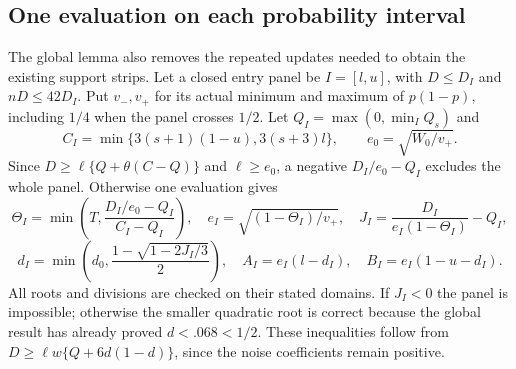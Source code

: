 \subsection{One evaluation on each probability interval}
The global lemma also removes the repeated updates needed to obtain the
existing support strips. Let a closed entry panel be $I=[l,u]$, with
$D\le D_I$ and $nD\le42D_I$. Put $v_-,v_+$ for its actual minimum and
maximum of $p(1-p)$, including $1/4$ when the panel crosses $1/2$.
Let $Q_I=\max(0,\min_I Q_s)$ and
\[
 C_I=\min\{3(s+1)(1-u),3(s+3)l\},\qquad e_0=\sqrt{W_0/v_+}.
\]
Since $D\ge\ell\{Q+\theta(C-Q)\}$ and $\ell\ge e_0$, a negative
$D_I/e_0-Q_I$ excludes the whole panel. Otherwise one evaluation gives
\begin{equation}\label{v10:geometry:panel}
 \Theta_I=\min\left(T,\frac{D_I/e_0-Q_I}{C_I-Q_I}\right),\quad
 e_I=\sqrt{(1-\Theta_I)/v_+},\quad
 J_I=\frac{D_I}{e_I(1-\Theta_I)}-Q_I,
\end{equation}
\[
 d_I=\min\left(d_0,\frac{1-\sqrt{1-2J_I/3}}2\right),\quad
 A_I=e_I(l-d_I),\quad B_I=e_I(1-u-d_I).
\]
All roots and divisions are checked on their stated domains. If $J_I<0$
the panel is impossible; otherwise the smaller quadratic root is correct
because the global result has already proved $d<.068<1/2$.
These inequalities follow from
$D\ge\ell w\{Q+6d(1-d)\}$, since the noise coefficients remain positive.


